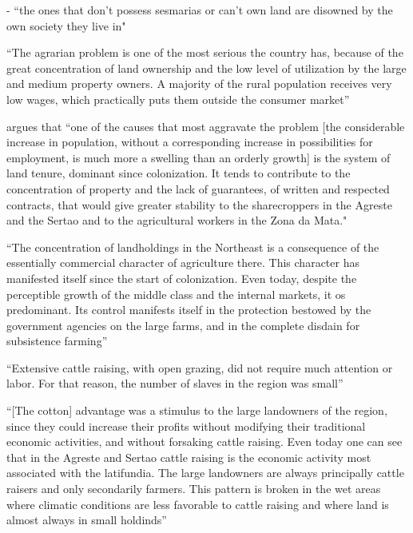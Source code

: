 \documentclass{article}
\begin{document}
\textcite{Simonsen2005-ps} - ``the ones that don't possess sesmarias or can't own land are disowned by the own society they live in"

\textcite[p.~1]{De_Oliveira_Andrade1980-xz}
``The agrarian problem is one of the most serious the country has, because of the great concentration of land ownership and the low level of utilization by the large and medium property owners. A majority of the rural population receives very low wages, which practically puts them outside the consumer market''

\textcite[p.~34-35]{De_Oliveira_Andrade1980-xz} argues that 
``one of the causes that most aggravate the problem [the considerable increase in population, without a corresponding increase in possibilities for employment, is much more a swelling than an orderly growth] is the system of land tenure, dominant since colonization. It tends to contribute to the concentration of property and the lack of guarantees, of written and respected contracts, that would give greater stability to the sharecroppers in the Agreste and the Sertao and to the agricultural workers in the Zona da Mata."

\textcite[p.~36]{De_Oliveira_Andrade1980-xz}
``The concentration of landholdings in the Northeast is a consequence of the essentially commercial character of agriculture there. This character has manifested itself since the start of colonization. Even today, despite the perceptible growth of the middle class and the internal markets, it os predominant. Its control manifests itself in the protection bestowed by the government agencies on the large farms, and in the complete disdain for subsistence farming''

\textcite[p.~113]{De_Oliveira_Andrade1980-xz}
``Extensive cattle raising, with open grazing, did not require much attention or labor. For that reason, the number of slaves in the region was small''

\textcite[p.~119]{De_Oliveira_Andrade1980-xz}
``[The cotton] advantage was a stimulus to the large landowners of the region, since they could increase their profits without modifying their traditional economic activities, and without forsaking cattle raising. Even today one can see that in the Agreste and Sertao cattle raising is the economic activity most associated with the latifundia. The large landowners are always principally cattle raisers and only secondarily farmers. This pattern is broken in the wet areas where climatic conditions are less favorable to cattle raising and where land is almost always in small holdinds''
\end{document}
